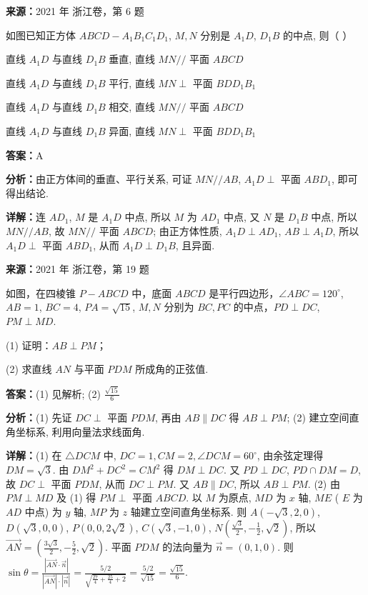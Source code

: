 \begin{question}[points=4]
\textbf{来源：}2021 年 浙江卷，第 6 题\par
如图已知正方体 $ABCD-A_1B_1C_1D_1$, $M,N$ 分别是 $A_1D$, $D_1B$ 的中点, 则（   ）
\begin{choices}
  \item 直线 $A_1D$ 与直线 $D_1B$ 垂直, 直线 $MN //$ 平面 $ABCD$
  \item 直线 $A_1D$ 与直线 $D_1B$ 平行, 直线 $MN \perp$ 平面 $BDD_1B_1$
  \item 直线 $A_1D$ 与直线 $D_1B$ 相交, 直线 $MN //$ 平面 $ABCD$
  \item 直线 $A_1D$ 与直线 $D_1B$ 异面, 直线 $MN \perp$ 平面 $BDD_1B_1$
\end{choices}
\begin{solution}
\textbf{答案：}A

\textbf{分析：}由正方体间的垂直、平行关系, 可证 $MN // AB$, $A_1D \perp$ 平面 $ABD_1$, 即可得出结论.

\textbf{详解：}连 $AD_1$, $M$ 是 $A_1D$ 中点, 所以 $M$ 为 $AD_1$ 中点, 又 $N$ 是 $D_1B$ 中点, 所以 $MN // AB$, 故 $MN //$ 平面 $ABCD$; 由正方体性质, $A_1D \perp AD_1$, $AB \perp A_1D$, 所以 $A_1D \perp$ 平面 $ABD_1$, 从而 $A_1D \perp D_1B$, 且异面.
\end{solution}
\end{question}

\begin{question}[points=15]
\textbf{来源：}2021 年 浙江卷，第 19 题\par
如图，在四棱锥 $P-ABCD$ 中，底面 $ABCD$ 是平行四边形，$\angle ABC=120^\circ$, $AB=1$, $BC=4$, $PA=\sqrt{15}$, $M,N$ 分别为 $BC, PC$ 的中点，$PD\perp DC$, $PM\perp MD$.

(1) 证明：$AB\perp PM$；

(2) 求直线 $AN$ 与平面 $PDM$ 所成角的正弦值.
\begin{solution}
\textbf{答案：}(1) 见解析; (2) $\frac{\sqrt{15}}{6}$

\textbf{分析：}(1) 先证 $DC\perp$ 平面 $PDM$, 再由 $AB\parallel DC$ 得 $AB\perp PM$; (2) 建立空间直角坐标系, 利用向量法求线面角.

\textbf{详解：}(1) 在 $\triangle DCM$ 中, $DC=1,CM=2,\angle DCM=60^\circ$, 由余弦定理得 $DM=\sqrt{3}$. 由 $DM^2+DC^2=CM^2$ 得 $DM\perp DC$. 又 $PD\perp DC$, $PD\cap DM=D$, 故 $DC\perp$ 平面 $PDM$, 从而 $DC\perp PM$. 又 $AB\parallel DC$, 所以 $AB\perp PM$.
(2) 由 $PM\perp MD$ 及 (1) 得 $PM\perp$ 平面 $ABCD$. 以 $M$ 为原点, $MD$ 为 $x$ 轴, $ME$ ( $E$ 为 $AD$ 中点) 为 $y$ 轴, $MP$ 为 $z$ 轴建立空间直角坐标系. 则 $A(-\sqrt{3},2,0)$, $D(\sqrt{3},0,0)$, $P(0,0,2\sqrt{2})$, $C(\sqrt{3},-1,0)$, $N(\frac{\sqrt{3}}{2},-\frac12,\sqrt{2})$, 所以 $\overrightarrow{AN}=(\frac{3\sqrt{3}}{2},-\frac52,\sqrt{2})$. 平面 $PDM$ 的法向量为 $\vec{n}=(0,1,0)$. 则 $\sin\theta = \frac{|\overrightarrow{AN}\cdot\vec{n}|}{|\overrightarrow{AN}|\cdot|\vec{n}|} = \frac{5/2}{\sqrt{\frac{27}{4}+\frac{25}{4}+2}} = \frac{5/2}{\sqrt{15}} = \frac{\sqrt{15}}{6}$.
\end{solution}
\end{question}

